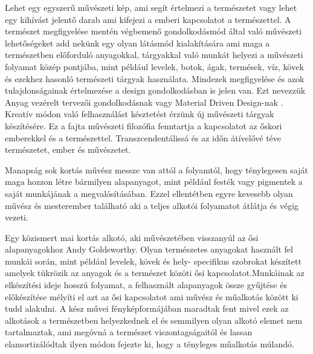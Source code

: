 
Lehet egy egyszerű művészeti kép, ami segít értelmezi a természetet vagy lehet egy kihívást jelentő darab ami kifejezi a emberi kapcsolatot a természettel.\cite{art_nature} 
A természet megfigyelése mentén végbemenő gondolkodásmód által való művészeti lehetőségeket  add nekünk egy olyan látásmód kialakítására ami maga a természetben előforduló anyagokkal, tárgyakkal való munkát helyezi a művészeti folyamat közép pontjába, mint például levelek, botok, ágak, termések, víz, kövek és ezekhez hasonló természeti tárgyak használata.
Mindezek megfigyelése és azok tulajdonságainak értelmezése a design gondolkodásban is jelen van. Ezt nevezzük Anyag vezérelt tervezői gondolkodásnak vagy Material Driven Design-nak \cite{karana2015material}.
Kreatív módon való felhasználást késztetést érzünk új művészeti tárgyak készítésére.
\cite{meller2002textile}
Ez a fajta művészeti filozófia fenntartja a kapcsolatot az őskori emberekkel és a természettel. Transzcendentálissá és az időn átívelővé téve természetet, ember és művészetet.

Manapság sok kortás művész messze van attól a folyamtól, hogy ténylegesen saját maga hozzon létre bármilyen alapanyagot, mint például festék vagy pigmentek a saját munkájának a megvalósításában. Ezzel ellentétben egyre kevesebb olyan művész és mesterember található aki a teljes alkotói folyamatot átlátja és végig vezeti.

\vspace{2 mm}
Egy közismert mai kortás alkotó, aki művészetében visszanyúl az ősi alapanyagokhoz Andy Goldsworthy. Olyan természetes anyagokat használt fel munkái során, mint például levelek, kövek és hely- specifikus szobrokat készített amelyek tükrözik az anyagok és a természet közöti ősi kapcsolatot.Munkáinak az elkészítési ideje hosszú folyamat, a felhasznált  alapanyagok össze gyűjtése és előkészítése mélyíti el azt az ősi kapcsolatot ami művész és műalkotás között ki tudd alakulni.
A kész művei fényképformájában maradtak fent mivel ezek az alkotások a természetben helyezkednek el és semmilyen olyan alkotó elemet nem tartalmaztak, ami megóvná a természet viszontagságaitól és lassan elamortizálódtak ilyen módon fejezte ki, hogy a tényleges műalkotás múlandó.

